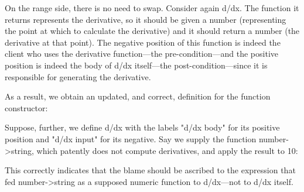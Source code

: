 On the range side, there is no need to swap. Consider again d/dx. The function
it returns represents the derivative, so it should be given a number
(representing the point at which to calculate the derivative) and it should
return a number (the derivative at that point). The negative position of this
function is indeed the client who uses the derivative function—the
pre-condition—and the positive position is indeed the body of d/dx itself—the
post-condition—since it is responsible for generating the derivative.

As a result, we obtain an updated, and correct, definition for the function
constructor:


Suppose, further, we define d/dx with the labels "d/dx body" for its positive
position and "d/dx input" for its negative. Say we supply the function number-
>string, which patently does not compute derivatives, and apply the result to
10:

This correctly indicates that the blame should be ascribed to the expression
that fed number->string as a supposed numeric function to d/dx—not to d/dx
itself.


